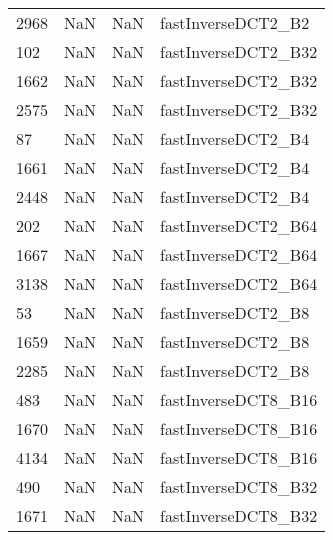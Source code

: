 \begin{tabular}{llll}
2968 &                   NaN &                        NaN &                        fastInverseDCT2\_B2 \\
102  &                   NaN &                        NaN &                       fastInverseDCT2\_B32 \\
1662 &                   NaN &                        NaN &                       fastInverseDCT2\_B32 \\
2575 &                   NaN &                        NaN &                       fastInverseDCT2\_B32 \\
87   &                   NaN &                        NaN &                        fastInverseDCT2\_B4 \\
1661 &                   NaN &                        NaN &                        fastInverseDCT2\_B4 \\
2448 &                   NaN &                        NaN &                        fastInverseDCT2\_B4 \\
202  &                   NaN &                        NaN &                       fastInverseDCT2\_B64 \\
1667 &                   NaN &                        NaN &                       fastInverseDCT2\_B64 \\
3138 &                   NaN &                        NaN &                       fastInverseDCT2\_B64 \\
53   &                   NaN &                        NaN &                        fastInverseDCT2\_B8 \\
1659 &                   NaN &                        NaN &                        fastInverseDCT2\_B8 \\
2285 &                   NaN &                        NaN &                        fastInverseDCT2\_B8 \\
483  &                   NaN &                        NaN &                       fastInverseDCT8\_B16 \\
1670 &                   NaN &                        NaN &                       fastInverseDCT8\_B16 \\
4134 &                   NaN &                        NaN &                       fastInverseDCT8\_B16 \\
490  &                   NaN &                        NaN &                       fastInverseDCT8\_B32 \\
1671 &                   NaN &                        NaN &                       fastInverseDCT8\_B32 \\

\end{tabular}
